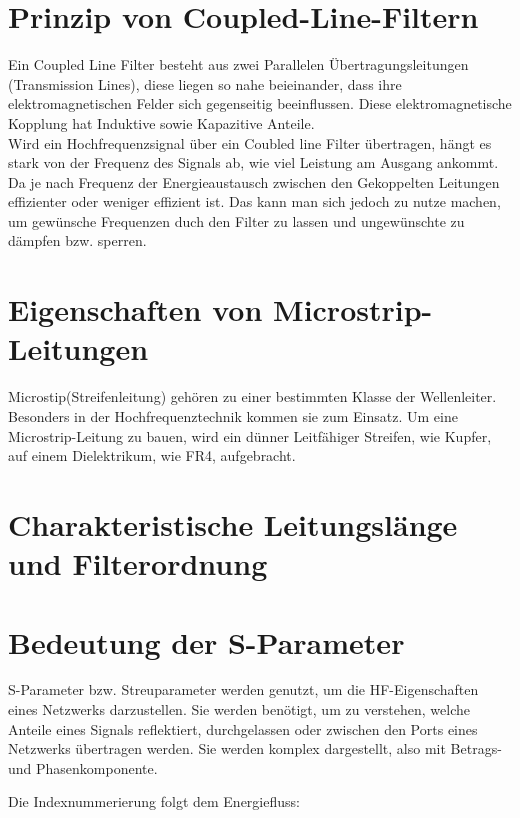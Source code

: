 \section{Prinzip von Coupled-Line-Filtern}
Ein Coupled Line Filter besteht aus zwei Parallelen Übertragungsleitungen (Transmission Lines), 
diese liegen so nahe beieinander, dass ihre elektromagnetischen Felder sich gegenseitig beeinflussen.
Diese elektromagnetische Kopplung hat Induktive sowie Kapazitive Anteile.
\\
Wird ein Hochfrequenzsignal über ein Coubled line Filter übertragen, hängt es stark
von der Frequenz des Signals ab, wie viel Leistung am Ausgang ankommt.
Da je nach Frequenz der Energieaustausch zwischen den Gekoppelten Leitungen effizienter oder weniger effizient ist.
Das kann man sich jedoch zu nutze machen, um gewünsche Frequenzen duch den Filter zu lassen und ungewünschte zu dämpfen bzw. sperren.

\section{Eigenschaften von Microstrip-Leitungen}
Microstip(Streifenleitung) gehören zu einer bestimmten Klasse der Wellenleiter.
Besonders in der Hochfrequenztechnik kommen sie zum Einsatz.
Um eine Microstrip-Leitung zu bauen, wird ein dünner Leitfähiger Streifen, wie Kupfer, auf einem Dielektrikum, wie FR4, aufgebracht.
\section{Charakteristische Leitungslänge und Filterordnung}

\section{Bedeutung der S-Parameter}
S-Parameter bzw. Streuparameter werden genutzt, um die HF-Eigenschaften eines
Netzwerks darzustellen. Sie werden benötigt, um zu verstehen, welche Anteile eines Signals
reflektiert, durchgelassen oder zwischen den Ports eines Netzwerks übertragen werden.
Sie werden komplex dargestellt, also mit Betrags- und Phasenkomponente.

Die Indexnummerierung folgt dem Energiefluss:

